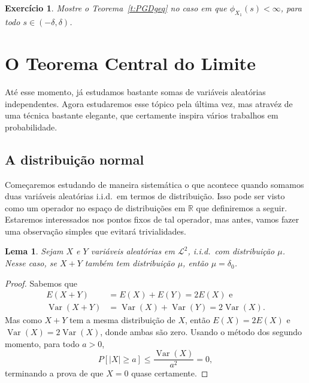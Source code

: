 \documentclass[reqno, draft]{book}
\newcommand*\1{\mathds{1}}
\newtheorem{lemma}[theorem]{Lema}
\newtheorem{exercise}[example]{Exercício}
\DeclareMathOperator{\Var}{Var}
\def \iid{i.i.d.~}
\begin{document}
\begin{exercise}
  Mostre o Teorema~\ref{t:PGDgeq} no caso em que $\phi_{X_1}(s) < \infty$, para todo $s \in (-\delta, \delta)$.
\end{exercise}

\section{O Teorema Central do Limite}

Até esse momento, já estudamos bastante somas de variáveis aleatórias independentes.
Agora estudaremos esse tópico pela última vez, mas atravéz de uma técnica bastante elegante, que certamente inspira vários trabalhos em probabilidade.

\subsection{A distribuição normal}

Começaremos estudando de maneira sistemática o que acontece quando somamos duas variáveis aleatórias \iid em termos de distribuição.
Isso pode ser visto como um operador no espaço de distribuições em $\mathbb{R}$ que definiremos a seguir.
Estaremos interessados nos pontos fixos de tal operador, mas antes, vamos fazer uma observação simples que evitará trivialidades.

\begin{lemma}
  Sejam $X$ e $Y$ variáveis aleatórias em $\mathcal{L}^2$, \iid com distribuição $\mu$.
  Nesse caso, se $X + Y$ também tem distribuição $\mu$, então $\mu = \delta_0$.
\end{lemma}

\begin{proof}
  Sabemos que
  \begin{equation}
    \begin{split}
      E(X + Y) & = E(X) + E(Y) = 2 E(X) \text{ e}\\
      \Var(X + Y) & = \Var(X) + \Var(Y) = 2 \Var(X).
    \end{split}
  \end{equation}
  Mas como $X + Y$ tem a mesma distribuição de $X$, então $E(X) = 2 E(X)$ e $\Var(X) = 2 \Var(X)$, donde ambas são zero.
  Usando o método dos segundo momento, para todo $a > 0$,
  \begin{equation}
    P[|X| \geq a] \leq \frac{\Var(X)}{a^2} = 0,
  \end{equation}
  terminando a prova de que $X = 0$ quase certamente.
\end{proof}
\end{document}
